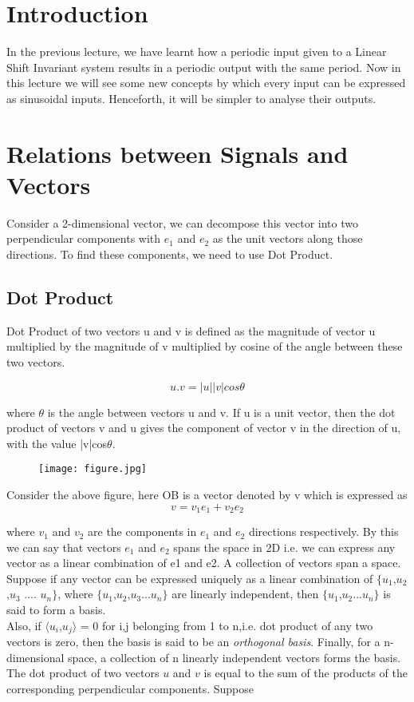 \section{Introduction}
In the previous lecture, we have learnt how a periodic input given to a Linear Shift Invariant system results in a periodic output with the same period. Now in this lecture we will see some new concepts by which every input can be expressed as sinusoidal inputs. Henceforth, it will be simpler to analyse their outputs.

\section{Relations between Signals and Vectors}
\label{sec:examples}
Consider a 2-dimensional vector, we can decompose this vector into two perpendicular components with $e_1$ and $e_2$ as the unit vectors along those directions. To find these components, we need to use Dot Product.
\subsection{Dot Product}
	Dot Product of two vectors u and v is defined as the magnitude of vector u multiplied by the magnitude of v multiplied by cosine of the angle between these two vectors.
    
	    					\begin{equation*}u.v = |u||v|cos\theta\end{equation*}
                            
where $\theta$ is the angle between vectors u and v. If u is a unit vector, then the dot product of vectors v and u gives the component of vector v in the direction of u, with the value |v|cos$\theta$.
	\begin{figure}[ht]
\centering
\texttt{[image: figure.jpg]}
\end{figure}
    
    
    Consider the above figure, here OB is a vector denoted by v which is expressed as
    \begin{equation*}v = v_1e_1 + v_2e_2\end{equation*}
    
    where $v_1$ and $v_2$ are the components in $e_1$ and $e_2$ directions respectively.
By this we can say that vectors $e_1$ and $e_2$ spans the space in 2D i.e. we can express any vector as a linear combination of e1 and e2. A collection of vectors span a space. Suppose if any vector can be expressed uniquely as a linear combination of $\{ u_1$,$u_2$,$u_3$ .... $u_n \}$, where $\{ u_1$,$u_2$,$u_3$...$u_n \}$ are linearly independent, then $\{ u_1$,$u_2$...$u_n \}$ is said to form a basis.\\
\noindent
Also, if $\langle u_i$,$u_j \rangle$ = 0 for i,j belonging from 1 to n,i.e. dot product of any two vectors is zero,  then the basis is said to be an \textit{orthogonal basis}. Finally, for a n-dimensional space, a collection of n linearly independent vectors forms the basis.\\
\noindent
The dot product of two vectors $u$ and $v$ is equal to the sum of the products of the corresponding perpendicular components. Suppose

